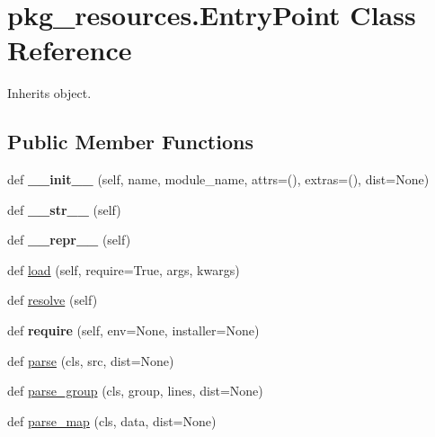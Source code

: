 \hypertarget{classpkg__resources_1_1_entry_point}{}\section{pkg\+\_\+resources.\+Entry\+Point Class Reference}
\label{classpkg__resources_1_1_entry_point}


Inherits object.

\subsection*{Public Member Functions}
\begin{DoxyCompactItemize}
\item 
\mbox{\label{classpkg__resources_1_1_entry_point_adf880358e5306e9187c4ea2538d321c8}} 
def {\bfseries \+\_\+\+\_\+init\+\_\+\+\_\+} (self, name, module\+\_\+name, attrs=(), extras=(), dist=None)
\item 
\mbox{\label{classpkg__resources_1_1_entry_point_ad68557d89e364b045aa0f3c39b80ea98}} 
def {\bfseries \+\_\+\+\_\+str\+\_\+\+\_\+} (self)
\item 
\mbox{\label{classpkg__resources_1_1_entry_point_a0eed4545673e7310df0f412db5b3ec03}} 
def {\bfseries \+\_\+\+\_\+repr\+\_\+\+\_\+} (self)
\item 
def \hyperlink{classpkg__resources_1_1_entry_point_a5438200cf3226e4762a3b94a456be23a}{load} (self, require=True, args, kwargs)
\item 
def \hyperlink{classpkg__resources_1_1_entry_point_a8c0fa0efa7012aab6b5711f0932bac9a}{resolve} (self)
\item 
\mbox{\label{classpkg__resources_1_1_entry_point_a49ea4be9e415eb29e8d256e90097a665}} 
def {\bfseries require} (self, env=None, installer=None)
\item 
def \hyperlink{classpkg__resources_1_1_entry_point_a3b155a03ae9e3e5f722c8258ddcec0cd}{parse} (cls, src, dist=None)
\item 
def \hyperlink{classpkg__resources_1_1_entry_point_aa6103add7859c9b6e0338b6866fe44ba}{parse\+\_\+group} (cls, group, lines, dist=None)
\item 
def \hyperlink{classpkg__resources_1_1_entry_point_a925bbccfaed5f41e1f676adb88199afa}{parse\+\_\+map} (cls, data, dist=None)
\end{DoxyCompactItemize}
